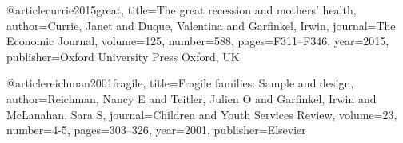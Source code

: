 @article{currie2015great,
  title={The great recession and mothers’ health},
  author={Currie, Janet and Duque, Valentina and Garfinkel, Irwin},
  journal={The Economic Journal},
  volume={125},
  number={588},
  pages={F311--F346},
  year={2015},
  publisher={Oxford University Press Oxford, UK}
}

@article{reichman2001fragile,
  title={Fragile families: Sample and design},
  author={Reichman, Nancy E and Teitler, Julien O and Garfinkel, Irwin and McLanahan, Sara S},
  journal={Children and Youth Services Review},
  volume={23},
  number={4-5},
  pages={303--326},
  year={2001},
  publisher={Elsevier}
}
